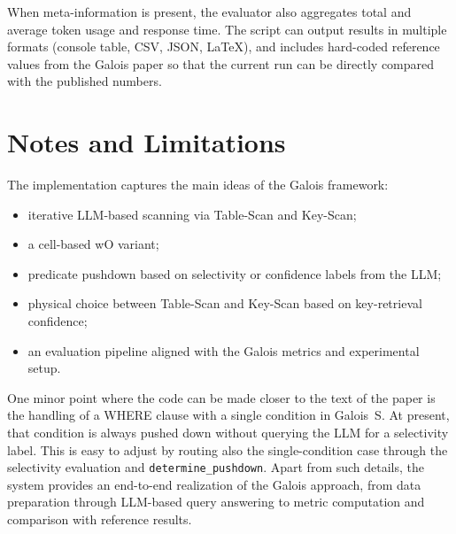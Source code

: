 \documentclass[11pt]{article}
\begin{document}
When meta-information is present, the evaluator also aggregates total and average token usage and response time. The script can output results in multiple formats (console table, CSV, JSON, LaTeX), and includes hard-coded reference values from the Galois paper so that the current run can be directly compared with the published numbers.

\section{Notes and Limitations}

The implementation captures the main ideas of the Galois framework:

\begin{itemize}
  \item iterative LLM-based scanning via Table-Scan and Key-Scan;
  \item a cell-based wO variant;
  \item predicate pushdown based on selectivity or confidence labels from the LLM;
  \item physical choice between Table-Scan and Key-Scan based on key-retrieval confidence;
  \item an evaluation pipeline aligned with the Galois metrics and experimental setup.
\end{itemize}

One minor point where the code can be made closer to the text of the paper is the handling of a WHERE clause with a single condition in Galois~S. At present, that condition is always pushed down without querying the LLM for a selectivity label. This is easy to adjust by routing also the single-condition case through the selectivity evaluation and \texttt{determine\_pushdown}. Apart from such details, the system provides an end-to-end realization of the Galois approach, from data preparation through LLM-based query answering to metric computation and comparison with reference results.
\end{document}
